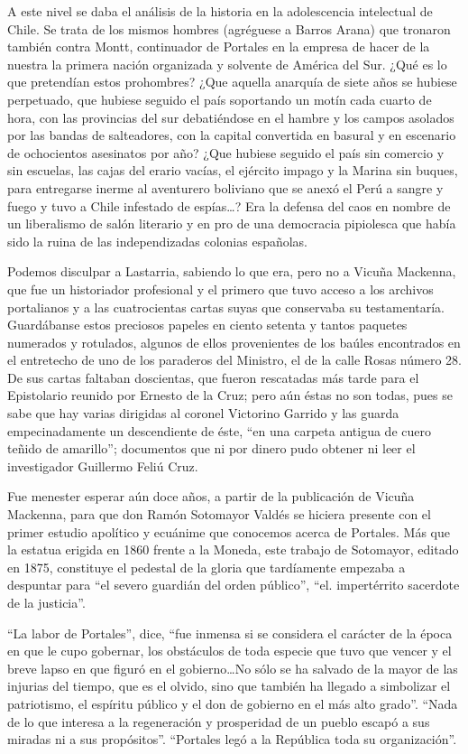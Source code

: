 \documentclass[10pt,twoside,openright]{memoir}
\begin{document}
A este nivel se daba el análisis de la historia en la adolescencia
intelectual de Chile. Se trata de los mismos hombres (agréguese a Barros
Arana) que tronaron también contra Montt, continuador de Portales en la
empresa de hacer de la nuestra la primera nación organizada y solvente
de América del Sur. ¿Qué es lo que pretendían estos prohombres? ¿Que
aquella anarquía de siete años se hubiese perpetuado, que hubiese
seguido el país soportando un motín cada cuarto de hora, con las
provincias del sur debatiéndose en el hambre y los campos asolados por
las bandas de salteadores, con la capital convertida en basural y en
escenario de ochocientos asesinatos por año? ¿Que hubiese seguido el
país sin comercio y sin escuelas, las cajas del erario vacías, el
ejército impago y la Marina sin buques, para entregarse inerme al
aventurero boliviano que se anexó el Perú a sangre y fuego y tuvo a
Chile infestado de espías\ldots? Era la defensa del caos en nombre de un
liberalismo de salón literario y en pro de una democracia pipiolesca que
había sido la ruina de las independizadas colonias españolas.

Podemos disculpar a Lastarria, sabiendo lo que era, pero no a Vicuña
Mackenna, que fue un historiador profesional y el primero que tuvo
acceso a los archivos portalianos y a las cuatrocientas cartas suyas que
conservaba su testamentaría. Guardábanse estos preciosos papeles en
ciento setenta y tantos paquetes numerados y rotulados, algunos de ellos
provenientes de los baúles encontrados en el entretecho de uno de los
paraderos del Ministro, el de la calle Rosas número 28. De sus cartas
faltaban doscientas, que fueron rescatadas más tarde para el Epistolario
reunido por Ernesto de la Cruz; pero aún éstas no son todas, pues se
sabe que hay varias dirigidas al coronel Victorino Garrido y las guarda
empecinadamente un descendiente de éste, ``en una carpeta antigua de
cuero teñido de amarillo''; documentos que ni por dinero pudo obtener ni
leer el investigador Guillermo Feliú Cruz.

Fue menester esperar aún doce años, a partir de la publicación de Vicuña
Mackenna, para que don Ramón Sotomayor Valdés se hiciera presente con el
primer estudio apolítico y ecuánime que conocemos acerca de Portales.
Más que la estatua erigida en 1860 frente a la Moneda, este trabajo de
Sotomayor, editado en 1875, constituye el pedestal de la gloria que
tardíamente empezaba a despuntar para ``el severo guardián del orden
público'', ``el. impertérrito sacerdote de la justicia''.

``La labor de Portales'', dice, ``fue inmensa si se considera el carácter
de la época en que le cupo gobernar, los obstáculos de toda especie que
tuvo que vencer y el breve lapso en que figuró en el gobierno\ldots No sólo
se ha salvado de la mayor de las injurias del tiempo, que es el olvido,
sino que también ha llegado a simbolizar el patriotismo, el espíritu
público y el don de gobierno en el más alto grado''. ``Nada de lo que
interesa a la regeneración y prosperidad de un pueblo escapó a sus
miradas ni a sus propósitos''. ``Portales legó a la República toda su
organización''.
\end{document}
